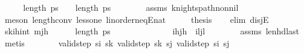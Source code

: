\begin{isabellebody}
%
\isadelimproof
%
\endisadelimproof
%
\isatagproof
{}\isamarkupfalse%
\ {\isacharminus}{\kern0pt}\isanewline
\ \ \isamarkupfalse%
\ {\isachardoublequoteopen}length\ ps\ {\isacharequal}{\kern0pt}\ {}\ {\isasymor}\ length\ ps\ {\isachargreater}{\kern0pt}\ {}{\isachardoublequoteclose}\isanewline
\ \ \ \ \isamarkupfalse%
\ assms\ knights{\isacharunderscore}{\kern0pt}path{\isacharunderscore}{\kern0pt}non{\isacharunderscore}{\kern0pt}nil\ \isamarkupfalse%
\ {\isacharparenleft}{\kern0pt}meson\ length{\isacharunderscore}{\kern0pt}{}{\isacharunderscore}{\kern0pt}conv\ less{\isacharunderscore}{\kern0pt}one\ linorder{\isacharunderscore}{\kern0pt}neqE{\isacharunderscore}{\kern0pt}nat{\isacharparenright}{\kern0pt}\isanewline
\ \ \isamarkupfalse%
\ \isamarkupfalse%
\ {\isacharquery}{\kern0pt}thesis\isanewline
\ \ \isamarkupfalse%
\ {\isacharparenleft}{\kern0pt}elim\ disjE{\isacharparenright}{\kern0pt}\isanewline
\ \ \ \ \isamarkupfalse%
\ {\isacharquery}{\kern0pt}s\isactrlsub k{\isacharequal}{\kern0pt}{\isachardoublequoteopen}{\isacharparenleft}{\kern0pt}i\isactrlsub h{\isacharcomma}{\kern0pt}int\ mj\isactrlsub h{\isacharparenright}{\kern0pt}{\isachardoublequoteclose}\isanewline
\ \ \ \ \isamarkupfalse%
\ {\isachardoublequoteopen}length\ ps\ {\isacharequal}{\kern0pt}\ {}{\isachardoublequoteclose}\isanewline
\ \ \ \ \isanewline
\ \ \ \ \isamarkupfalse%
\ \isamarkupfalse%
\ {\isachardoublequoteopen}{\isacharparenleft}{\kern0pt}i\isactrlsub h{\isacharcomma}{\kern0pt}j\isactrlsub h{\isacharparenright}{\kern0pt}\ {\isacharequal}{\kern0pt}\ {\isacharparenleft}{\kern0pt}i\isactrlsub l{\isacharcomma}{\kern0pt}j\isactrlsub l{\isacharparenright}{\kern0pt}{\isachardoublequoteclose}\isanewline
\ \ \ \ \ \ \isamarkupfalse%
\ assms\ len{}{\isacharunderscore}{\kern0pt}hd{\isacharunderscore}{\kern0pt}last\ \isamarkupfalse%
\ metis\isanewline
\ \ \ \ \isamarkupfalse%
\ \isamarkupfalse%
\ {\isachardoublequoteopen}valid{\isacharunderscore}{\kern0pt}step\ s\isactrlsub i\ {\isacharquery}{\kern0pt}s\isactrlsub k{\isachardoublequoteclose}\ {\isachardoublequoteopen}valid{\isacharunderscore}{\kern0pt}step\ {\isacharquery}{\kern0pt}s\isactrlsub k\ s\isactrlsub j{\isachardoublequoteclose}\ {\isachardoublequoteopen}valid{\isacharunderscore}{\kern0pt}step\ s\isactrlsub i\ s\isactrlsub j{\isachardoublequoteclose}\isanewline

\end{isabellebody}
